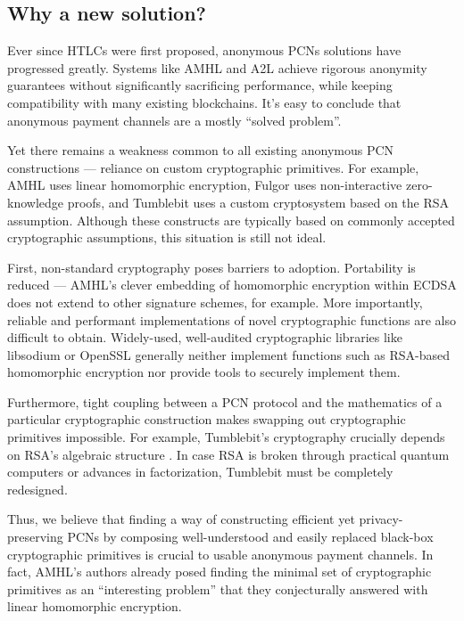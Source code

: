 \documentclass[USenglish,oneside,twocolumn]{article}
\begin{document}
\subsection{Why a new solution?}

Ever since HTLCs were first proposed, anonymous PCNs solutions have progressed greatly. Systems like AMHL and A2L achieve rigorous anonymity guarantees without significantly sacrificing performance, while keeping compatibility with many existing blockchains. It's easy to conclude that anonymous payment channels are a mostly ``solved problem''.

Yet there remains a weakness common to all existing anonymous PCN constructions --- reliance on custom cryptographic primitives. For example, AMHL uses linear homomorphic encryption, Fulgor uses non-interactive zero-knowledge proofs, and Tumblebit uses a custom cryptosystem based on the RSA assumption. Although these constructs are typically based on commonly accepted cryptographic assumptions, this situation is still not ideal.

First, non-standard cryptography poses barriers to adoption. Portability is reduced --- AMHL's clever embedding of homomorphic encryption within ECDSA does not extend to other signature schemes, for example. More importantly, reliable and performant implementations of novel cryptographic functions are also difficult to obtain. Widely-used, well-audited cryptographic libraries like libsodium \cite{libsodium} or OpenSSL \cite{openssl} generally neither implement functions such as RSA-based homomorphic encryption nor provide tools to securely implement them.

Furthermore, tight coupling between a PCN protocol and the mathematics of a particular cryptographic construction makes swapping out cryptographic primitives impossible. For example, Tumblebit's cryptography crucially depends on RSA's algebraic structure \cite{heilman2017tumblebit}. In case RSA is broken through practical quantum computers or advances in factorization, Tumblebit must be completely redesigned.

Thus, we believe that finding a way of constructing efficient yet privacy-preserving PCNs by composing well-understood and easily replaced black-box cryptographic primitives is crucial to usable anonymous payment channels. In fact, AMHL's authors already posed finding the minimal set of cryptographic primitives as an ``interesting problem'' \cite{malavolta2019anonymous} that they conjecturally answered with linear homomorphic encryption.
\end{document}

